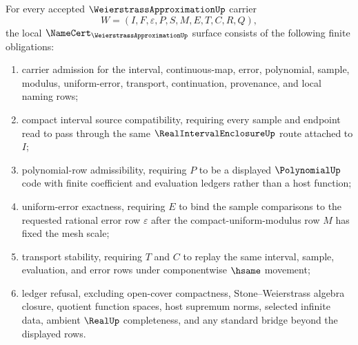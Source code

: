\begin{theorem}
\label{thm:weierstrass-approximation-namecert-obligations}
For every accepted $\WeierstrassApproximationUp$ carrier
$$
W=(I,F,\varepsilon,P,S,M,E,T,C,R,Q),
$$
the local $\NameCert_{\WeierstrassApproximationUp}$ surface consists of the following finite obligations:
\begin{enumerate}
\item carrier admission for the interval, continuous-map, error, polynomial, sample, modulus, uniform-error, transport, continuation, provenance, and local naming rows;
\item compact interval source compatibility, requiring every sample and endpoint read to pass through the same $\RealIntervalEnclosureUp$ route attached to $I$;
\item polynomial-row admissibility, requiring $P$ to be a displayed $\PolynomialUp$ code with finite coefficient and evaluation ledgers rather than a host function;
\item uniform-error exactness, requiring $E$ to bind the sample comparisons to the requested rational error row $\varepsilon$ after the compact-uniform-modulus row $M$ has fixed the mesh scale;
\item transport stability, requiring $T$ and $C$ to replay the same interval, sample, evaluation, and error rows under componentwise $\hsame$ movement;
\item ledger refusal, excluding open-cover compactness, Stone--Weierstrass algebra closure, quotient function spaces, host supremum norms, selected infinite data, ambient $\RealUp$ completeness, and any standard bridge beyond the displayed rows.
\end{enumerate}
\end{theorem}
